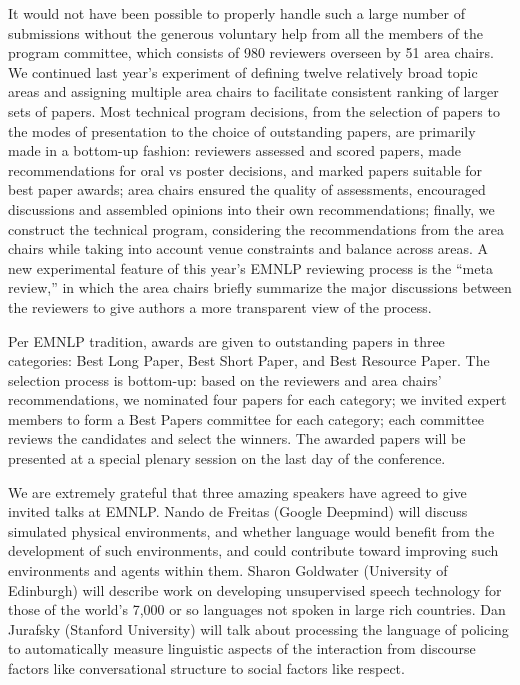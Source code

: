 It would not have been possible to properly handle such a large number of submissions without the generous voluntary help from all the members of the program committee, which consists of 980 reviewers overseen by 51 area chairs. We continued last year’s experiment of defining twelve relatively broad topic areas and assigning multiple area chairs to facilitate consistent ranking of larger sets of papers. Most technical program decisions, from the selection of papers to the modes of presentation to the choice of outstanding papers, are primarily made in a bottom-up fashion: reviewers assessed and scored papers, made recommendations for oral vs poster decisions, and marked papers suitable for best paper awards; area chairs ensured the quality of assessments, encouraged discussions and assembled opinions into their own recommendations; finally, we construct the technical program, considering the recommendations from the area chairs while taking into account venue constraints and balance across areas. A new experimental feature of this year’s EMNLP reviewing process is the “meta review,” in which the area chairs briefly summarize the major discussions between the reviewers to give authors a more transparent view of the process. 

Per EMNLP tradition, awards are given to outstanding papers in three categories: Best Long Paper, Best Short Paper, and Best Resource Paper. The selection process is bottom-up:
based on the reviewers and area chairs’ recommendations, we nominated four papers for each category; we invited expert members to form a Best Papers committee for each category; each committee reviews the candidates and select the winners. The awarded papers will be presented at a special plenary session on the last day of the conference. 

We are extremely grateful that three amazing speakers have agreed to give invited talks at EMNLP. Nando de Freitas (Google Deepmind) will discuss simulated physical environments, and whether language would benefit from the development of such environments, and could contribute toward improving such environments and agents within them. Sharon Goldwater (University of Edinburgh) will describe work on developing unsupervised speech technology for those of the world's 7,000 or so languages not spoken in large rich countries. Dan Jurafsky (Stanford University) will talk about processing the language of policing to automatically measure linguistic aspects of the interaction from discourse factors like conversational structure to social factors like respect. 

